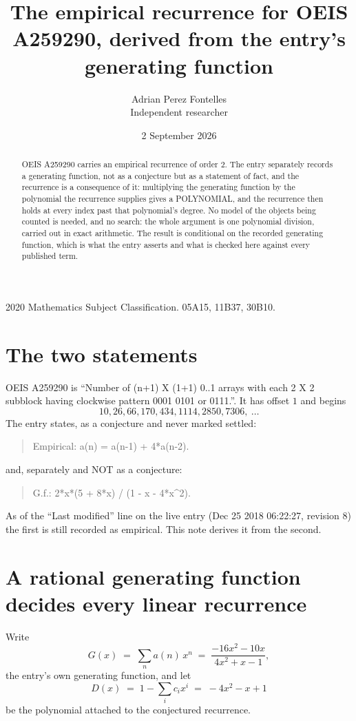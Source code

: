 \documentclass[11pt,a4paper]{article}
\title{The empirical recurrence for OEIS A259290, derived from the entry's generating function}
\author{Adrian Perez Fontelles\\ \small Independent researcher}
\date{2 September 2026}
\theoremstyle{plain}
\theoremstyle{definition}
\begin{document}
\maketitle

\begin{abstract}
OEIS A259290 carries an empirical recurrence of order $2$. The entry separately records a
generating function, not as a conjecture but as a statement of fact, and the recurrence is a
consequence of it: multiplying the generating function by the polynomial the recurrence
supplies gives a POLYNOMIAL, and the recurrence then holds at every index past that
polynomial's degree. No model of the objects being counted is needed, and no search: the
whole argument is one polynomial division, carried out in exact arithmetic. The result is
conditional on the recorded generating function, which is what the entry asserts and what is
checked here against every published term.
\end{abstract}

\noindent\small 2020 Mathematics Subject Classification. 05A15, 11B37, 30B10.\normalsize

\section{The two statements}

OEIS A259290 is ``Number of (n+1) X (1+1) 0..1 arrays with each 2 X 2 subblock having clockwise pattern 0001 0101 or 0111.''. It has offset $1$ and begins
\[
10, 26, 66, 170, 434, 1114, 2850, 7306,\ \dots
\]
The entry states, as a conjecture and never marked settled:
\begin{quote}
Empirical: a(n) = a(n-1) + 4*a(n-2).
\end{quote}
and, separately and NOT as a conjecture:
\begin{quote}
G.f.: 2*x*(5 + 8*x) / (1 - x - 4*x\^{}2).
\end{quote}
As of the ``Last modified'' line on the live entry (Dec 25 2018 06:22:27, revision 8) the first is still
recorded as empirical. This note derives it from the second.

\section{A rational generating function decides every linear recurrence}

Write
\[
G(x)\;=\;\sum_{n}a(n)\,x^{n}\;=\;\frac{- 16 x^{2} - 10 x}{4 x^{2} + x - 1},
\]
the entry's own generating function, and let
\[
D(x)\;=\;1-\sum_i c_i x^{i}\;=\;- 4 x^{2} - x + 1
\]
be the polynomial attached to the conjectured recurrence.
\end{document}
